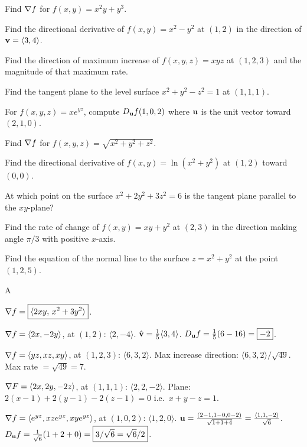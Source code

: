 \documentclass[11pt]{article}
\begin{document}
\begin{problems}
\item Find $\nabla f$ for $f(x,y) = x^2 y + y^3$.
\item Find the directional derivative of $f(x,y) = x^2 - y^2$ at $(1,2)$ in the direction of $\mathbf{v} = \langle 3, 4\rangle$.
\item Find the direction of maximum increase of $f(x,y,z) = xyz$ at $(1,2,3)$ and the magnitude of that maximum rate.
\item Find the tangent plane to the level surface $x^2 + y^2 - z^2 = 1$ at $(1, 1, 1)$.
\item For $f(x,y,z) = x e^{yz}$, compute $D_{\mathbf{u}} f(1, 0, 2)$ where $\mathbf{u}$ is the unit vector toward $(2, 1, 0)$.
\end{problems}

\vfill
\newpage
{}
\begin{problems}
\item Find $\nabla f$ for $f(x,y,z) = \sqrt{x^2 + y^2 + z^2}$.
\item Find the directional derivative of $f(x,y) = \ln(x^2 + y^2)$ at $(1, 2)$ toward $(0, 0)$.
\item At which point on the surface $x^2 + 2y^2 + 3z^2 = 6$ is the tangent plane parallel to the $xy$-plane?
\item Find the rate of change of $f(x,y) = xy + y^2$ at $(2, 3)$ in the direction making angle $\pi/3$ with positive $x$-axis.
\item Find the equation of the normal line to the surface $z = x^2 + y^2$ at the point $(1, 2, 5)$.
\end{problems}

\vfill
\newpage
{}

\begin{answers}{A}
\item $\nabla f = \boxed{\langle 2xy, \, x^2 + 3y^2\rangle}$.
\item $\nabla f = \langle 2x, -2y\rangle$, at $(1,2)$: $\langle 2, -4\rangle$. $\hat{\mathbf{v}} = \tfrac{1}{5}\langle 3, 4\rangle$. $D_{\mathbf{u}} f = \tfrac{1}{5}(6 - 16) = \boxed{-2}$.
\item $\nabla f = \langle yz, xz, xy\rangle$, at $(1,2,3)$: $\langle 6, 3, 2\rangle$. Max increase direction: $\langle 6,3,2\rangle/\sqrt{49}$. Max rate $= \boxed{\sqrt{49} = 7}$.
\item $\nabla F = \langle 2x, 2y, -2z\rangle$, at $(1,1,1)$: $\langle 2, 2, -2\rangle$. Plane: $\boxed{2(x-1) + 2(y-1) - 2(z-1) = 0}$ i.e.\ $x + y - z = 1$.
\item $\nabla f = \langle e^{yz}, xz e^{yz}, xy e^{yz}\rangle$, at $(1,0,2)$: $\langle 1, 2, 0\rangle$. $\mathbf{u} = \tfrac{(2-1, 1-0, 0-2)}{\sqrt{1+1+4}} = \tfrac{\langle 1,1,-2\rangle}{\sqrt 6}$. $D_{\mathbf{u}} f = \tfrac{1}{\sqrt 6}(1 + 2 + 0) = \boxed{3/\sqrt 6 = \sqrt{6}/2}$.
\end{answers}
\end{document}
